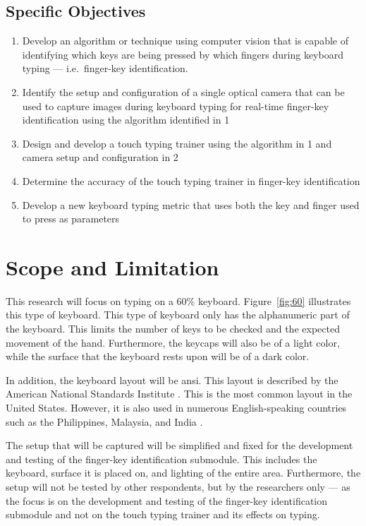 \documentclass{report}
\begin{document}
\subsection{Specific Objectives}
\begin{enumerate}
	\item Develop an algorithm or technique using computer vision that is capable
	      of identifying which keys are being pressed by which fingers during keyboard
	      typing --- i.e.\ finger-key identification.
	\item Identify the setup and configuration of a single optical camera that can
	      be used to capture images during keyboard typing for real-time finger-key
	      identification using the algorithm identified in 1
	\item Design and develop a touch typing trainer using the algorithm in 1 and
	      camera setup and configuration in 2
	\item Determine the accuracy of the touch typing trainer in finger-key
	      identification
	\item Develop a new keyboard typing metric that uses both the key and
	      finger used to press as parameters
\end{enumerate}


\section{Scope and Limitation}
This research will focus on typing on a 60\% keyboard. Figure~\ref{fig:60}
illustrates this type of keyboard. This type of keyboard only has the
alphanumeric part of the keyboard. This limits the number of keys to be checked
and the expected movement of the hand. Furthermore, the keycaps will also be of
a light color, while the surface that the keyboard rests upon will be of a dark
color.

In addition, the keyboard layout will be \ac{ansi}. This layout is described by
the American National Standards Institute \parencite{ansi}. This is the most
common layout in the United States. However, it is also used in numerous
English-speaking countries such as the Philippines, Malaysia, and India
\parencite{apple-layout}.

The setup that will be captured will be simplified and fixed for the development
and testing of the finger-key identification submodule. This includes the
keyboard, surface it is placed on, and lighting of the entire area. Furthermore,
the setup will not be tested by other respondents, but by the researchers only
--- as the focus is on the development and testing of the finger-key
identification submodule and not on the touch typing trainer and its effects on
typing.
\end{document}
